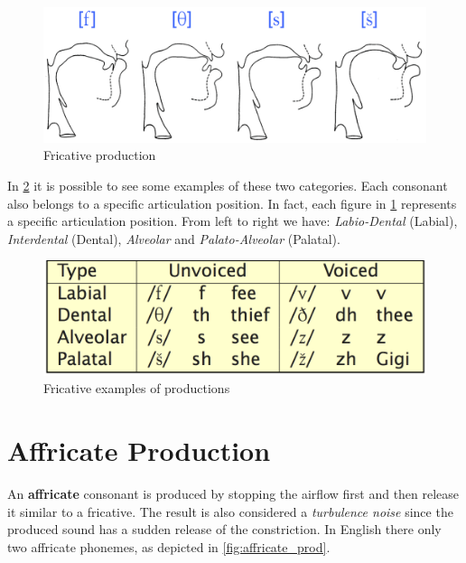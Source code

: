 \begin{figure}[!ht]
    \centering
    \includegraphics[scale=0.5]{Figures/fricative_production.png}
    \caption{Fricative production \cite{mit_phonetics}}
    \label{fig:fricative_prod}
\end{figure}

\noindent In \ref{fig:fricative_ex} it is possible to see some examples of these two categories. Each consonant also belongs to a specific articulation position. In fact, each figure in \ref{fig:fricative_prod} represents a specific articulation position. From left to right we have: \textit{Labio-Dental} (Labial), \textit{Interdental} (Dental), \textit{Alveolar} and \textit{Palato-Alveolar} (Palatal).

\begin{figure}[!ht]
    \centering
    \includegraphics[scale=0.5]{Figures/fricative_examples.png}
    \caption{Fricative examples of productions \cite{mit_phonetics}}
    \label{fig:fricative_ex}
\end{figure}


\section{Affricate Production}
\label{sec:Affricate Production}
An \textbf{affricate} consonant is produced by stopping the airflow first and then release it similar to a fricative. The result is also considered a \textit{turbulence noise} since the produced sound has a sudden release of the constriction. In English there only two affricate phonemes, as depicted in \ref{fig:affricate_prod}.

